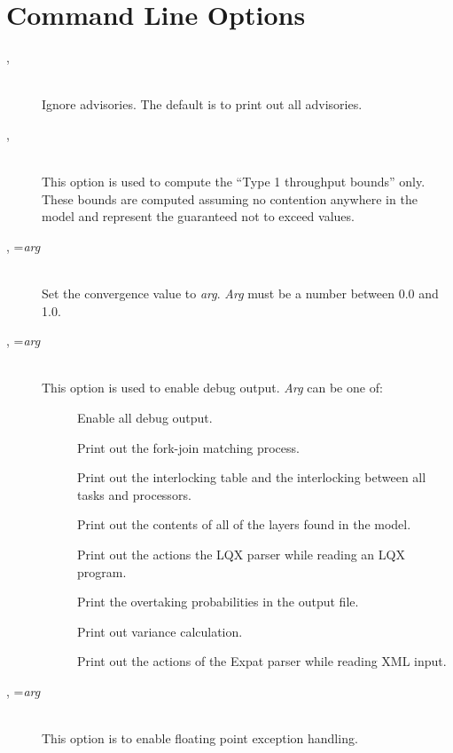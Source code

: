 \section{Command Line Options}
\label{sec:options}
\begin{description}
\item[, ]~\\
Ignore advisories.  The default is to print out all advisories.
\item[, ]~\\
This option is used to compute the ``Type 1 throughput bounds'' only.
These bounds are computed assuming no contention anywhere in the model
and represent the guaranteed not to exceed values.
\item[, =\emph{arg}]~\\
Set the convergence value to \emph{arg}.  
\emph{Arg} must be a number between 0.0 and 1.0.
\item[, =\emph{arg}]~\\
This option is used to enable debug output.
\emph{Arg} can be one of:
\begin{description}
\item[]
Enable all debug output.
\item[]
Print out the fork-join matching process.
\item[]
Print out the interlocking table and the interlocking between all tasks and processors.
\item[]
Print out the contents of all of the layers found in the model.
\item[]
Print out the actions the LQX parser while reading an LQX program.
\item[]
Print the overtaking probabilities in the output file.
\item[]
Print out variance calculation.
\item[]
Print out the actions of the Expat parser while reading XML input.
\end{description}
\item[, =\emph{arg}]~\\
This option is to enable floating point exception handling.

\end{description}
